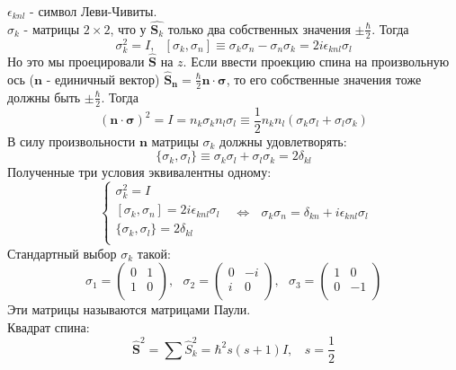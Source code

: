 	$\epsilon_{knl}$ - символ Леви-Чивиты.\\
	$\sigma_k$ - матрицы $2\times2$, что у $\hat{\textbf{S}_k}$ только два собственных значения $\pm\frac{\hbar}{2}$. Тогда
	$$
		\sigma^2_k = I,  \ \ \ [\sigma_k, \sigma_n] \equiv \sigma_k\sigma_n-\sigma_n\sigma_k = 2i\epsilon_{knl}\sigma_l
	$$
	Но это мы проецировали $\hat{\textbf{S}}$ на $z$. Если ввести проекцию спина на произвольную ось ($\textbf{n}$ - единичный вектор) $\hat{\textbf{S}}_{\textbf{n}} = \frac{\hbar}{2}\textbf{n}\cdot\bm{\sigma}$, то его собственные значения тоже должны быть $\pm\frac{\hbar}{2}$. Тогда 
	$$
		(\textbf{n}\cdot\bm{\sigma})^2 = I = n_k\sigma_k n_l\sigma_l \equiv \frac{1}{2}n_k n_l(\sigma_k\sigma_l + \sigma_l\sigma_k)
	$$
	В силу произвольности $\textbf{n}$ матрицы $\sigma_k$ должны удовлетворять:
	$$
		\{\sigma_k,\sigma_l\} \equiv \sigma_k\sigma_l + \sigma_l\sigma_k = 2\delta_{kl}
	$$
	Полученные три условия эквивалентны одному:
	$$
		\left\{
			\begin{array}{l}
				\sigma^2_k = I\\
				\left[\sigma_k, \sigma_n\right] = 2i\epsilon_{knl}\sigma_l\\
				\{\sigma_k,\sigma_l\} = 2\delta_{kl}\\
			\end{array}
		\right.
		 \ \ \ \Leftrightarrow  \ \ \ \sigma_k\sigma_n = \delta_{kn} + i\epsilon_{knl}\sigma_l
	$$
	Стандартный выбор $\sigma_k$ такой:
	$$
		\sigma_1 = \left( 
		\begin{array}{cc}
			0 & 1\\
			1 & 0\\
		\end{array} 
		\right), \ \ \ 
		\sigma_2 = \left( 
		\begin{array}{cc}
		0 & -i\\
		i & 0\\
		\end{array} 
		\right), \ \ \
		\sigma_3 = \left( 
		\begin{array}{cc}
		1 & 0\\
		0 & -1\\
		\end{array} 
		\right)
	$$
	Эти матрицы называются матрицами Паули. \\
	Квадрат спина:
	$$
		\hat{\textbf{S}}^2 = \sum\hat{S}_k^2 = \hbar^2 s(s+1) I, \ \ \ \ s = \frac{1}{2}
	$$

